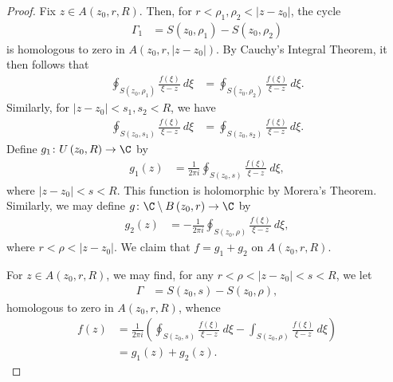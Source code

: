 \documentclass[10pt]{mypackage}
\begin{document}
\begin{proof}
  Fix $z\in A\left( z_0,r,R \right)$. Then, for $r < \rho_1,\rho_2 < \left\vert z-z_0 \right\vert$, the cycle
  \begin{align*}
    \Gamma_1 &= S\left( z_0,\rho_1 \right) - S\left( z_0,\rho_2 \right)
  \end{align*}
  is homologous to zero in $A\left( z_0,r,\left\vert z-z_0 \right\vert \right)$. By Cauchy's Integral Theorem, it then follows that
  \begin{align*}
    \oint_{S\left( z_0,\rho_1 \right)}^{} \frac{f\left( \xi \right)}{\xi-z}\:d\xi &= \oint_{S\left( z_0,\rho_2 \right)}^{} \frac{f\left( \xi \right)}{\xi-z}\:d\xi.
  \end{align*}
  Similarly, for $\left\vert z-z_0 \right\vert < s_1,s_2 < R$, we have
  \begin{align*}
    \oint_{S\left( z_0,s_1 \right)}^{} \frac{f\left( \xi \right)}{\xi-z}\:d\xi &= \oint_{S\left( z_0,s_2 \right)}^{} \frac{f\left( \xi \right)}{\xi-z}\:d\xi.
  \end{align*}
  Define $g_1\colon U\left( z_0,R \right)\rightarrow \C$ by
  \begin{align*}
    g_1(z) &= \frac{1}{2\pi i} \oint_{S\left( z_0,s \right)}^{} \frac{f\left( \xi \right)}{\xi - z}\:d\xi,
  \end{align*}
  where $ \left\vert z-z_0 \right\vert < s < R $. This function is holomorphic by Morera's Theorem. Similarly, we may define $g\colon \C\setminus B\left( z_0,r \right)\rightarrow \C$ by
  \begin{align*}
    g_2\left( z \right) &= -\frac{1}{2\pi i} \oint_{S\left( z_0,\rho \right)}^{} \frac{f\left( \xi \right)}{\xi-z}\:d\xi,
  \end{align*}
  where $r < \rho < \left\vert z-z_0 \right\vert$. We claim that $f = g_1 + g_2$ on $A\left( z_0,r,R \right)$.\newline

  For $z\in A\left( z_0,r,R \right)$, we may find, for any $r < \rho < \left\vert z-z_0 \right\vert < s < R$, we let
  \begin{align*}
    \Gamma &= S\left( z_0,s \right) - S\left( z_0,\rho \right),
  \end{align*}
  homologous to zero in $A\left( z_0,r,R \right)$, whence
  \begin{align*}
    f\left( z \right) &= \frac{1}{2\pi i} \left( \oint_{S\left( z_0,s \right)}^{} \frac{f\left( \xi \right)}{\xi-z}\:d\xi - \int_{S\left( z_0,\rho \right)}^{} \frac{f\left( \xi \right)}{\xi - z}\:d\xi \right)\\
                      &= g_1\left( z \right) + g_2\left( z \right).
  \end{align*}

\end{proof}
\end{document}
